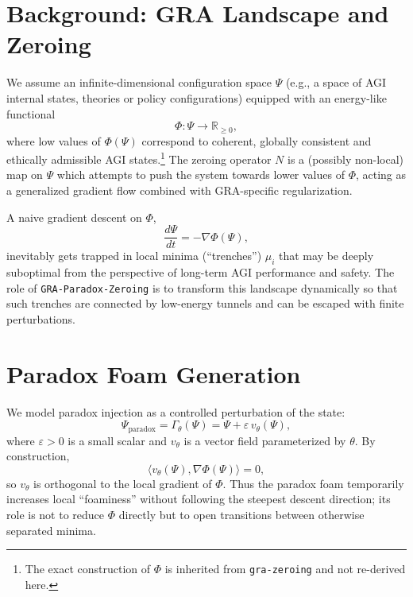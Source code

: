 \documentclass[11pt]{article}
\begin{document}
\section{Background: GRA Landscape and Zeroing}

We assume an infinite-dimensional configuration space $\Psi$ (e.g., a space of AGI internal states, theories or policy configurations) equipped with an energy-like functional
\begin{equation}
    \Phi : \Psi \to \mathbb{R}_{\ge 0},
\end{equation}
where low values of $\Phi(\Psi)$ correspond to coherent, globally consistent and ethically admissible AGI states.\footnote{The exact construction of $\Phi$ is inherited from \texttt{gra-zeroing} and not re-derived here.} 
The zeroing operator $N$ is a (possibly non-local) map on $\Psi$ which attempts to push the system towards lower values of $\Phi$, acting as a generalized gradient flow combined with GRA-specific regularization.

A naive gradient descent on $\Phi$,
\begin{equation}
    \frac{d\Psi}{dt} = - \nabla \Phi(\Psi),
\end{equation}
inevitably gets trapped in local minima (``trenches'') $\mu_i$ that may be deeply suboptimal from the perspective of long-term AGI performance and safety. 
The role of \texttt{GRA-Paradox-Zeroing} is to transform this landscape dynamically so that such trenches are connected by low-energy tunnels and can be escaped with finite perturbations.

\section{Paradox Foam Generation}

We model paradox injection as a controlled perturbation of the state:
\begin{equation}
    \Psi_{\text{paradox}} = \Gamma_{\theta}(\Psi) 
    = \Psi + \varepsilon \, v_{\theta}(\Psi),
\end{equation}
where $\varepsilon > 0$ is a small scalar and $v_{\theta}$ is a vector field parameterized by $\theta$. 
By construction,
\begin{equation}
    \langle v_{\theta}(\Psi), \nabla \Phi(\Psi) \rangle = 0,
\end{equation}
so $v_{\theta}$ is orthogonal to the local gradient of $\Phi$. 
Thus the paradox foam temporarily increases local ``foaminess'' without following the steepest descent direction; its role is not to reduce $\Phi$ directly but to open transitions between otherwise separated minima.
\end{document}
